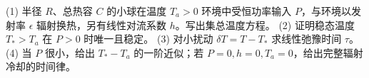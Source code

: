 (1) 半径 \(R\)、总热容 \(C\) 的小球在温度 \(T_a>0\) 环境中受恒功率输入 \(P\)，与环境以发射率 \(\epsilon\) 辐射换热，另有线性对流系数 \(h\)。写出集总温度方程。
(2) 证明稳态温度 \(T_*>T_a\) 在 \(P>0\) 时唯一且稳定。
(3) 对小扰动 \(\delta T=T-T_*\) 求线性弛豫时间 \(\tau\)。
(4) 当 \(P\) 很小，给出 \(T_*-T_a\) 的一阶近似；若 \(P=0,h=0,T_a=0\)，给出完整辐射冷却的时间律。
